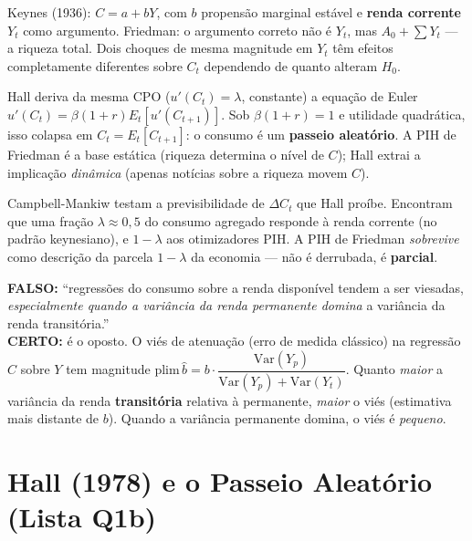 \documentclass[12pt, a4paper]{article}
\begin{document}
\begin{fatorbox}[title={a) Diferença em relação à hipótese keynesiana}]
Keynes (1936): $C = a + bY$, com $b$ propensão marginal estável e
\textbf{renda corrente} $Y_t$ como argumento. Friedman: o argumento correto
não é $Y_t$, mas $A_0+\sum Y_t$ --- a riqueza total. Dois choques de mesma
magnitude em $Y_t$ têm efeitos completamente diferentes sobre $C_t$
dependendo de quanto alteram $H_0$.
\end{fatorbox}

\begin{fatorbox}[title={b) Relação com Hall (1978)}]
Hall deriva da mesma CPO ($u'(C_t)=\lambda$, constante) a equação de Euler
$u'(C_t) = \beta(1+r)E_t[u'(C_{t+1})]$. Sob $\beta(1+r)=1$ e utilidade
quadrática, isso colapsa em $C_t = E_t[C_{t+1}]$: o consumo é um
\textbf{passeio aleatório}. A PIH de Friedman é a base estática (riqueza
determina o nível de $C$); Hall extrai a implicação \emph{dinâmica}
(apenas notícias sobre a riqueza movem $C$).
\end{fatorbox}

\begin{fatorbox}[title={c) Relação com Campbell-Mankiw (1989)}]
Campbell-Mankiw testam a previsibilidade de $\Delta C_t$ que Hall proíbe.
Encontram que uma fração $\lambda\approx 0{,}5$ do consumo agregado responde
à renda corrente (no padrão keynesiano), e $1-\lambda$ aos otimizadores PIH.
A PIH de Friedman \emph{sobrevive} como descrição da parcela $1-\lambda$ da
economia --- não é derrubada, é \textbf{parcial}.
\end{fatorbox}

\begin{armbox}[title={Armadilha (P2-2021 Q1-i)}]
\textbf{FALSO:} ``regressões do consumo sobre a renda disponível tendem a
ser viesadas, \emph{especialmente quando a variância da renda permanente
domina} a variância da renda transitória.'' \\
\textbf{CERTO:} é o oposto. O viés de atenuação (erro de medida clássico)
na regressão $C$ sobre $Y$ tem magnitude
$\mathrm{plim}\,\hat b = b\cdot \dfrac{\mathrm{Var}(Y_p)}{\mathrm{Var}(Y_p)+\mathrm{Var}(Y_t)}$.
Quanto \emph{maior} a variância da renda \textbf{transitória} relativa à
permanente, \emph{maior} o viés (estimativa mais distante de $b$). Quando a
variância permanente domina, o viés é \emph{pequeno}.
\end{armbox}

\section{Hall (1978) e o Passeio Aleatório (Lista Q1b)}
\end{document}
